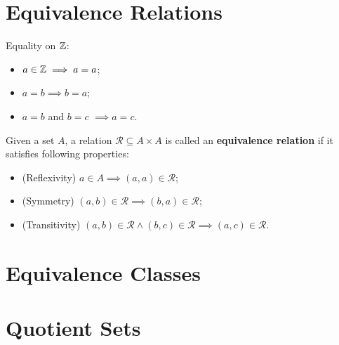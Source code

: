 \documentclass[11pt,openany]{article}
\begin{document}
\section*{Equivalence Relations}
\begin{center}

\end{center}
\begin{example*}Equality on $\mathbb{Z}$: \begin{itemize}
	\item $a\in \mathbb{Z}\implies a=a$;
	\item $a=b\implies b=a$;
	\item $a=b$ and $b=c$ $\implies a=c$.
\end{itemize}
\end{example*}
\begin{definition*}
	Given a set $A$, a relation $\mathcal{R}\subseteq A\times A$ is called an \textbf{equivalence relation} if it satisfies following properties: \begin{itemize}
		\item (Reflexivity) $a\in A\implies (a,a)\in{\mathcal{R}}$;
		\item (Symmetry) $(a,b)\in \mathcal{R}\implies (b,a)\in \mathcal{R}$;
		\item (Transitivity) $(a,b)\in\mathcal{R}\land (b,c)\in\mathcal{R}\implies (a,c)\in\mathcal{R}$.
	\end{itemize}
\end{definition*}

\section*{Equivalence Classes}
\begin{center}

\end{center}

\section*{Quotient Sets}
\begin{center}

\end{center}
\end{document}
